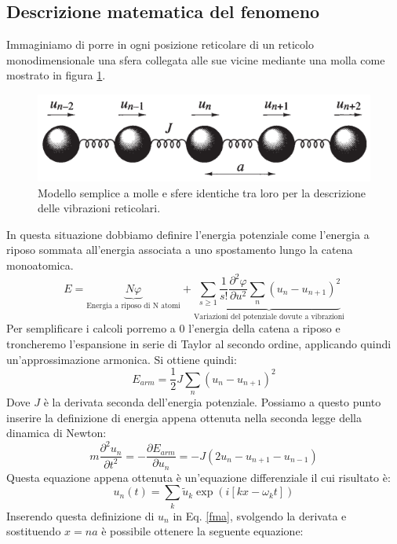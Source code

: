 \documentclass[oneside]{amsbook}
\numberwithin{section}{chapter}
\numberwithin{equation}{section}
\numberwithin{figure}{section}
\begin{document}
\subsection{Descrizione matematica del fenomeno}
Immaginiamo di porre in ogni posizione reticolare di un reticolo monodimensionale una sfera collegata alle sue vicine mediante una molla come mostrato in figura \ref{molle}.
\begin{figure}[H]
\centering
\caption{Modello semplice a molle e sfere identiche tra loro per la descrizione delle vibrazioni reticolari.}\label{molle}
\includegraphics[scale=0.5]{molle}
\end{figure}
In questa situazione dobbiamo definire l'energia potenziale come l'energia a riposo sommata all'energia associata a uno spostamento lungo la catena monoatomica.
\begin{equation}
E=\underbrace{N\varphi}_\text{Energia a riposo di N atomi}+\underbrace{\sum_{s\geq1}\frac{1}{s!}\frac{\partial^2\varphi}{\partial u^2}\sum_n\left(u_n-u_{n+1}\right)^2}_{\text{Variazioni del potenziale dovute a vibrazioni}}
\end{equation}
Per semplificare i calcoli porremo a $0$ l'energia della catena a riposo e troncheremo l'espansione in serie di Taylor al secondo ordine, applicando quindi un'approssimazione armonica.
Si ottiene quindi:
\begin{equation}
E_{arm}=\frac{1}{2}J\sum_n\left(u_n-u_{n+1}\right)^2
\end{equation}
Dove $J$ è la derivata seconda dell'energia potenziale. Possiamo a questo punto inserire la definizione di energia appena ottenuta nella seconda legge della dinamica di Newton:
\begin{equation}
\label{fma}
m\frac{\partial^2u_n}{\partial t^2}=-\frac{\partial E_{arm}}{\partial u_n}=-J(2u_n-u_{n+1}-u_{n-1})
\end{equation}
Questa equazione appena ottenuta è un'equazione differenziale il cui risultato è:
\begin{equation}
u_n(t)=\sum_k \tilde{u}_k \exp (i[kx-\omega_kt])
\end{equation}
Inserendo questa definizione di $u_n$ in Eq. \ref{fma}, svolgendo la derivata e sostituendo $x=na$ è possibile ottenere la seguente equazione:
\end{document}
